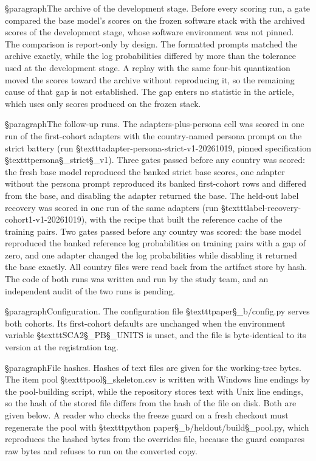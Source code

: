 {§paragraph{The archive of the development stage.} Before every scoring run, a gate compared the base model's scores on the frozen software stack with the archived scores of the development stage, whose software environment was not pinned. The comparison is report-only by design. The formatted prompts matched the archive exactly, while the log probabilities differed by more than the tolerance used at the development stage. A replay with the same four-bit quantization moved the scores toward the archive without reproducing it, so the remaining cause of that gap is not established. The gap enters no statistic in the article, which uses only scores produced on the frozen stack.

§paragraph{The follow-up runs.} The adapters-plus-persona cell was scored in one run of the first-cohort adapters with the country-named persona prompt on the strict battery (run §texttt{adapter-persona-strict-v1-20261019}, pinned specification §texttt{persona§_strict§_v1}). Three gates passed before any country was scored: the fresh base model reproduced the banked strict base scores, one adapter without the persona prompt reproduced its banked first-cohort rows and differed from the base, and disabling the adapter returned the base. The held-out label recovery was scored in one run of the same adapters (run §texttt{label-recovery-cohort1-v1-20261019}), with the recipe that built the reference cache of the training pairs. Two gates passed before any country was scored: the base model reproduced the banked reference log probabilities on training pairs with a gap of zero, and one adapter changed the log probabilities while disabling it returned the base exactly. All country files were read back from the artifact store by hash. The code of both runs was written and run by the study team, and an independent audit of the two runs is pending.

§paragraph{Configuration.} The configuration file §texttt{paper§_b/config.py} serves both cohorts. Its first-cohort defaults are unchanged when the environment variable §texttt{SCA2§_PB§_UNITS} is unset, and the file is byte-identical to its version at the registration tag.

§paragraph{File hashes.} Hashes of text files are given for the working-tree bytes. The item pool §texttt{pool§_skeleton.csv} is written with Windows line endings by the pool-building script, while the repository stores text with Unix line endings, so the hash of the stored file differs from the hash of the file on disk. Both are given below. A reader who checks the freeze guard on a fresh checkout must regenerate the pool with §texttt{python paper§_b/heldout/build§_pool.py}, which reproduces the hashed bytes from the overrides file, because the guard compares raw bytes and refuses to run on the converted copy.

}
